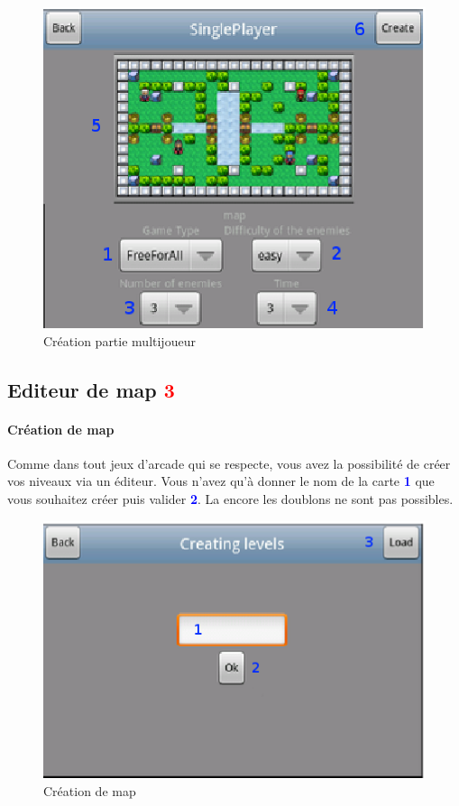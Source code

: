 	\begin{figure}[h]
	\centering
		\includegraphics[scale=0.7]{Manuel/Img/15.eps}
		\caption{Création partie multijoueur}
	\end{figure}
	
	
\subsection{Editeur de map \textcolor{red}{3} }
	
	\paragraph{Création de map\\}
	Comme dans tout jeux d'arcade qui se respecte, vous avez la possibilité de
	créer vos niveaux via un éditeur. Vous n'avez qu'à donner le nom de la carte
	\textcolor{blue}{\textbf{1}}	que vous souhaitez créer puis valider
	\textcolor{blue}{\textbf{2}}. La encore les doublons ne sont pas possibles.
	
	\begin{figure}[h]
		\centering
			\includegraphics[scale=0.7]{Manuel/Img/10.eps}
			\caption{Création de map}
		\end{figure}

